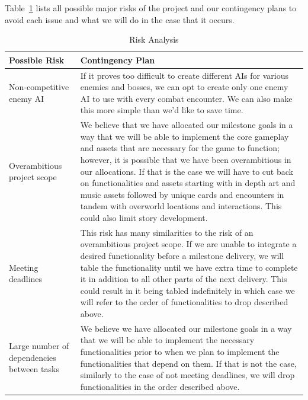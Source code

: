 \documentclass[12pt,titlepage]{article}
\begin{document}
Table~\ref{tab:risks} lists all possible major risks of the project and
our contingency plans to avoid each issue and what we will do in the case that
it occurs.

\begin{table}[H]
    \caption{Risk Analysis}
    \label{tab:risks}
    \centering
    \begin{tabularx}{\linewidth}{|l|X|}
        \hline
        \textbf{Possible Risk} & \textbf{Contingency Plan} \\
        \hline
        Non-competitive enemy AI & If it proves too difficult to create
        different AIs for various enemies and bosses, we can opt to create
        only one enemy AI to use with every combat encounter. We can also
        make this more simple than we'd like to save time. \\
        \hline
        Overambitious project scope & We believe that we have allocated our
        milestone goals in a way that we will be able to implement the core
        gameplay and assets that are necessary for the game to function;
        however, it is possible that we have been overambitious in our
        allocations. If that is the case we will have to cut back on
        functionalities and assets starting with in depth art and music assets
        followed by unique cards and encounters in tandem with overworld
        locations and interactions. This could also limit story development.  \\
        \hline
        Meeting deadlines & This risk has many similarities to the risk of an
        overambitious project scope. If we are unable to integrate a desired
        functionality before a milestone delivery, we will table the
        functionality until we have extra time to complete it in addition to
        all other parts of the next delivery. This could result in it being
        tabled indefinitely in which case we will refer to the order of
        functionalities to drop described above. \\
        \hline
        Large number of dependencies between tasks & We believe we have
        allocated our milestone goals in a way that we will be able to
        implement the necessary functionalities prior to when we plan to
        implement the functionalities that depend on them. If that is not the
        case, similarly to the case of not meeting deadlines, we will drop
        functionalities in the order described above. \\
        \hline
    \end{tabularx}
\end{table}
\end{document}
